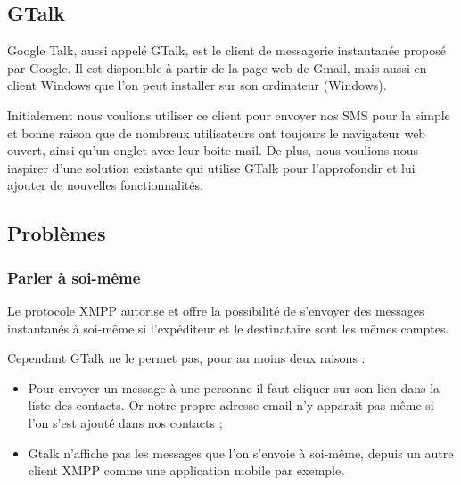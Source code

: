 \subsection{GTalk}
\label{GTalk}

Google Talk, aussi appelé GTalk, est le client de messagerie instantanée proposé par Google.
Il est disponible à partir de la page web de Gmail, mais aussi en client Windows que l'on peut installer sur son ordinateur (Windows).

Initialement nous voulions utiliser ce client pour envoyer nos SMS pour la simple et bonne raison que de nombreux utilisateurs ont toujours le navigateur web ouvert, ainsi qu'un onglet avec leur boite mail.
De plus, nous voulions nous inspirer d'une solution existante qui utilise GTalk pour l'approfondir et lui ajouter de nouvelles fonctionnalités.


\subsection{Problèmes}
\label{Problèmes}


\subsubsection{Parler à soi-même}

Le protocole XMPP autorise et offre la possibilité de s'envoyer des messages instantanés à soi-même si l'expéditeur et le destinataire sont les mêmes comptes.

Cependant GTalk ne le permet pas, pour au moins deux raisons :
\begin{itemize}
	\item Pour envoyer un message à une personne il faut cliquer sur son lien dans la liste des contacts.
	Or notre propre adresse email n'y apparait pas même si l'on s'est ajouté dans nos contacts ;
	\item Gtalk n'affiche pas les messages que l'on s'envoie à soi-même, depuis un autre client XMPP comme une application mobile par exemple.
\end{itemize}

